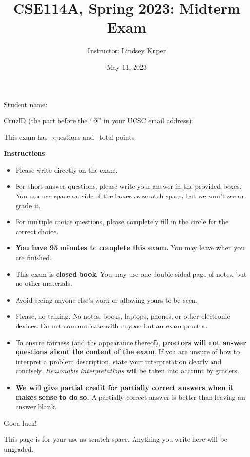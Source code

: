 \documentclass[addpoints]{exam}
\title{CSE114A, Spring 2023: Midterm Exam}
\author{Instructor: Lindsey Kuper}
\date{May 11, 2023}
\begin{document}
\maketitle

\begin{coverpages}

\bigskip  

\noindent Student name: \hrulefill

\bigskip
\bigskip

\noindent CruzID (the part before the ``@'' in your UCSC email address): \hrulefill

\bigskip
\bigskip

\noindent This exam has \numquestions~questions and \numpoints~total points.

\bigskip
\bigskip

\noindent \textbf{Instructions}

\begin{itemize}
\item Please write directly on the exam.
\item For short answer questions, please write your answer in the provided boxes.  You can use space outside of the boxes as scratch space, but we won't see or grade it.
\item For multiple choice questions, please completely fill in the circle for the correct choice.
\item \textbf{You have 95 minutes to complete this exam.} You may leave when you are finished.
\item This exam is \textbf{closed book}.  You may use one double-sided page of notes, but no other materials.
\item Avoid seeing anyone else's work or allowing yours to be seen.
\item Please, no talking.  No notes, books, laptops, phones, or other electronic devices. Do not communicate with anyone but an exam proctor.
\item To ensure fairness (and the appearance thereof),
  \textbf{proctors will not answer questions about the content of the exam}. If you are unsure 
  of how to interpret a problem description, state your interpretation clearly and concisely. 
  \textit{Reasonable interpretations} will be taken into account by graders.
\item \textbf{We will give partial credit for partially correct answers when it makes sense to do so.} A partially correct answer is better than leaving an answer blank.
\end{itemize}
  
\bigskip

\noindent Good luck!

\newpage

This page is for your use as scratch space. Anything you write here will be ungraded.

\newpage  

\end{coverpages}
\end{document}
